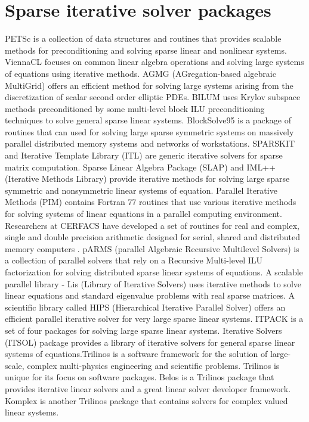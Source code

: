 \section{Sparse iterative solver packages}
PETSc \cite{petsc} is a collection of data structures and routines that provides scalable methods for preconditioning and solving sparse linear and nonlinear systems. ViennaCL \cite{viennacl} focuses on common linear algebra operations and solving large systems of equations using iterative methods. AGMG (AGregation-based algebraic MultiGrid) \cite{agmg} offers an efficient method for solving large systems arising from the discretization of scalar second order elliptic PDEs. BILUM \cite{bilum} uses Krylov subspace methods preconditioned by some multi-level block ILU preconditioning techniques to solve general sparse linear systems. BlockSolve95 \cite{blocksolve95} is a package of routines that can used for solving large sparse symmetric systems on massively parallel distributed memory systems and networks of workstations. SPARSKIT \cite{sparskit} and Iterative Template Library (ITL) \cite{itl} are generic iterative solvers for sparse matrix computation. Sparse Linear Algebra Package (SLAP) \cite{slap} and IML++ (Iterative Methods Library) \cite{pozo} provide iterative methods for solving large sparse symmetric and nonsymmetric linear systems of equation. Parallel Iterative Methods (PIM) \cite{pim} contains Fortran 77 routines that use various iterative methods for solving systems of linear equations in a parallel computing environment. Researchers at CERFACS have developed a set of routines for real and complex, single and double precision arithmetic designed for serial, shared and distributed memory computers \cite{cerfacs}. pARMS (parallel Algebraic Recursive Multilevel Solvers) \cite{parms} is a collection of parallel solvers that rely on a Recursive Multi-level ILU factorization for solving distributed sparse linear systems of equations. A scalable parallel library - Lis (Library of Iterative Solvers) \cite{lis} uses iterative methods to solve linear equations and standard eigenvalue problems with real sparse matrices. A scientific library called HIPS (Hierarchical Iterative Parallel Solver) \cite{hips} offers an efficient parallel iterative solver for very large sparse linear systems. ITPACK \cite{itpack} is a set of four packages for solving large sparse linear systems. Iterative Solvers (ITSOL) \cite{itsol} package provides a library of iterative solvers for general sparse linear systems of equations.Trilinos \cite{trilinos} is a software framework for the solution of large-scale, complex multi-physics engineering and scientific problems. Trilinos is unique for its focus on software packages. Belos \cite{belos} is a Trilinos package that provides iterative linear solvers and a great linear solver developer framework. Komplex \cite{komplex} is another Trilinos package that contains solvers for complex valued linear systems.


